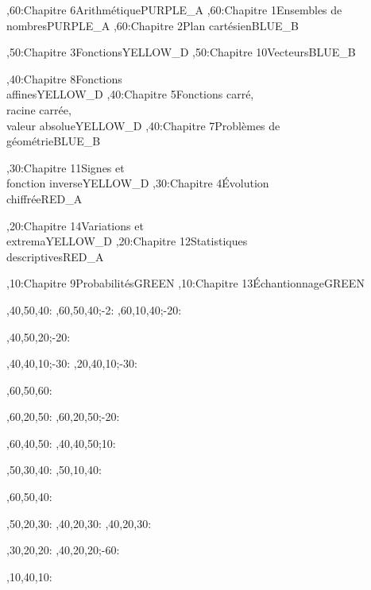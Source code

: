 \documentclass[tikz]{standalone}
\begin{document}
%
	\begin{chart}
	,60:{Chapitre 6}{Arithmétique}{}{PURPLE_A}
	,60:{Chapitre 1}{Ensembles de \\ nombres}{}{PURPLE_A}
	,60:{Chapitre 2}{Plan cartésien}{}{BLUE_B}
	
	,50:{Chapitre 3}{Fonctions}{}{YELLOW_D}
	,50:{Chapitre 10}{Vecteurs}{}{BLUE_B}
	
	,40:{Chapitre 8}{Fonctions \\ affines}{}{YELLOW_D}
	,40:{Chapitre 5}{Fonctions carré, \\ racine carrée, \\ valeur absolue}{}{YELLOW_D}
	,40:{Chapitre 7}{Problèmes de \\ géométrie}{}{BLUE_B}
	
	,30:{Chapitre 11}{Signes et \\ fonction inverse}{}{YELLOW_D}
	,30:{Chapitre 4}{Évolution \\ chiffrée}{}{RED_A}
	
	,20:{Chapitre 14}{Variations et \\ extrema}{}{YELLOW_D}
	,20:{Chapitre 12}{Statistiques \\ descriptives}{}{RED_A}
	
	,10:{Chapitre 9}{Probabilités}{}{GREEN}
	,10:{Chapitre 13}{Échantionnage}{}{GREEN}
	
	
	
	
	,40,50,40:
	,60,50,40;-2:
	,60,10,40;-20:
	
	
	
	,40,50,20;-20:
	
	,40,40,10;-30:
	,20,40,10;-30:

	,60,50,60:
	
	,60,20,50:
	,60,20,50;-20:
	
	,60,40,50:
	,40,40,50;10:
	
	,50,30,40:
	,50,10,40:
	
	,60,50,40:
	
	,50,20,30:
	,40,20,30:
	,40,20,30:
	
	,30,20,20:
	,40,20,20;-60:
	
	,10,40,10:
	
	\end{chart}
%
\end{document}
